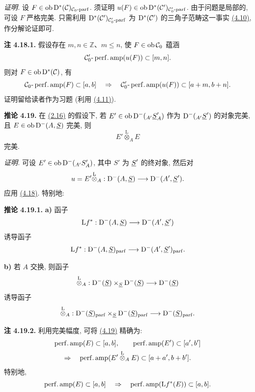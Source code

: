 \emph{证明.} 设 \(F\in\operatorname{ob}\mathrm D^*(\mathcal C)_{\mathcal C_0\text{-}\mathrm{parf}}\). 须证明 \(u(F)\in\operatorname{ob}\mathrm D^*(\mathcal C')_{\mathcal C'_0\text{-}\mathrm{parf}}\). 由于问题是局部的, 可设 \(F\) 严格完美. 只需利用 \(\mathrm D^*(\mathcal C')_{\mathcal C'_0\text{-}\mathrm{parf}}\) 为 \(\mathrm D^*(\mathcal C')\) 的三角子范畴这一事实 \hyperlink{sga6.e01.prop.4-10}{(4.10)}, 作分解论证即可.

\textbf{注 4.18.1.} 假设存在 \(m,n\in\mathbb Z\)、\(m\leq n\), 使 \(F\in\operatorname{ob}\mathcal C_0\) 蕴涵
\[
  \mathcal C'_0\text{-}\operatorname{perf.amp}(u(F))\subset[m,n].
\]
则对 \(F\in\operatorname{ob}\mathrm D^*(\mathcal C)\), 有
\[
  \mathcal C_0\text{-}\operatorname{perf.amp}(F)
  \subset [a,b]
  \quad\Rightarrow\quad
  \mathcal C'_0\text{-}\operatorname{perf.amp}(u(F))
  \subset [a+m,b+n].
\]
证明留给读者作为习题 (利用 \hyperlink{sga6.e01.complement.4-11}{(4.11)}).

\textbf{推论 4.19.} 在 \hyperlink{sga6.e01.cor.2-16}{(2.16)} 的假设下, 若 \(E'\in\operatorname{ob}\mathrm D^-(_{A'}\underline S'_A)\) 作为 \(\mathrm D^-(_{A'}\underline S')\) 的对象完美, 且 \(E\in\operatorname{ob}\mathrm D^-(A,\underline S)\) 完美, 则
\[
  E'\overset{\mathrm L}{\otimes}_A E
\]
完美.

\emph{证明.} 可设 \(E'\in\operatorname{ob}\mathrm D^-(_{A'}S'_A)\), 其中 \(S'\) 为 \(\underline S'\) 的终对象, 然后对
\[
  u=E'\overset{\mathrm L}{\otimes}_A:
  \mathrm D^-(A,\underline S)\longrightarrow \mathrm D^-(A',\underline S').
\]
应用 \hyperlink{sga6.e01.prop.4-18}{(4.18)}. 特别地:

\textbf{推论 4.19.1.} \textbf{a)} 函子
\[
  \mathrm L f^*:\mathrm D^-(A,\underline S)\longrightarrow \mathrm D^-(A',\underline S')
\]
诱导函子
\[
  \mathrm L f^*:\mathrm D^-(A,\underline S)_{\mathrm{parf}}
  \longrightarrow
  \mathrm D^-(A',\underline S')_{\mathrm{parf}}.
\]

\textbf{b)} 若 \(A\) 交换, 则函子
\[
  \overset{\mathrm L}{\otimes}_A:
  \mathrm D^-(\underline S)\times_{\underline S}\mathrm D^-(\underline S)
  \longrightarrow \mathrm D^-(\underline S)
\]
诱导函子
\[
  \overset{\mathrm L}{\otimes}_A:
  \mathrm D^-(\underline S)_{\mathrm{parf}}\times_{\underline S}\mathrm D^-(\underline S)_{\mathrm{parf}}
  \longrightarrow \mathrm D^-(\underline S)_{\mathrm{parf}}.
\]

\textbf{注 4.19.2.} 利用完美幅度, 可将 \hyperlink{sga6.e01.cor.4-19}{(4.19)} 精确为:
\[
\begin{gathered}
  \operatorname{perf.amp}(E)\subset[a,b],\qquad
  \operatorname{perf.amp}(E')\subset[a',b']\\
  \Rightarrow\quad
  \operatorname{perf.amp}(E'\overset{\mathrm L}{\otimes}_A E)\subset[a+a',b+b'].
\end{gathered}
\]
特别地,
\[
  \operatorname{perf.amp}(E)\subset[a,b]
  \quad\Rightarrow\quad
  \operatorname{perf.amp}(\mathrm L f^*(E))\subset[a,b].
\]

